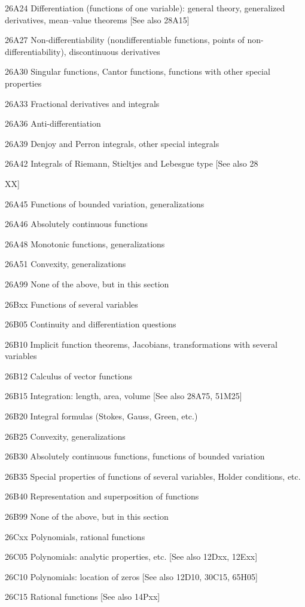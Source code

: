 \documentclass[12pt]{article}
\theoremstyle{plain}
\theoremstyle{definition}
\numberwithin{equation}{section}
\begin{document}
{26A24 Differentiation (functions of one variable): general theory, generalized derivatives, mean--value theorems [See also 28A15]

26A27 Non-differentiability (nondifferentiable functions, points of non-differentiability), discontinuous derivatives

26A30 Singular functions, Cantor functions, functions with other special properties

26A33 Fractional derivatives and integrals

26A36 Anti-differentiation

26A39 Denjoy and Perron integrals, other special integrals

26A42 Integrals of Riemann, Stieltjes and Lebesgue type [See also 28{XX]

26A45 Functions of bounded variation, generalizations

26A46 Absolutely continuous functions

26A48 Monotonic functions, generalizations

26A51 Convexity, generalizations

26A99 None of the above, but in this section

26Bxx Functions of several variables

26B05 Continuity and differentiation questions

26B10 Implicit function theorems, Jacobians, transformations with several variables

26B12 Calculus of vector functions

26B15 Integration: length, area, volume [See also 28A75, 51M25]

26B20 Integral formulas (Stokes, Gauss, Green, etc.)

26B25 Convexity, generalizations

26B30 Absolutely continuous functions, functions of bounded variation

26B35 Special properties of functions of several variables, Holder conditions, etc.

26B40 Representation and superposition of functions

26B99 None of the above, but in this section

26Cxx Polynomials, rational functions

26C05 Polynomials: analytic properties, etc. [See also 12Dxx, 12Exx]

26C10 Polynomials: location of zeros [See also 12D10, 30C15, 65H05]

26C15 Rational functions [See also 14Pxx]

}}
\end{document}
